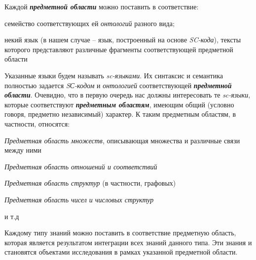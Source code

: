 \begin{SCn}
{Каждой \textbf{\textit{предметной области}} можно поставить в соответствие:
\begin{scnitemize}
    \item семейство соответствующих ей \textit{онтологий} разного вида;
    \item некий язык (в нашем случае -- язык, построенный на основе \textit{SC-кода}), тексты которого представляют различные фрагменты соответствующей предметной области
\end{scnitemize}


Указанные языки будем называть \textit{sc-языками}. Их синтаксис и семантика полностью задается \textit{SС-кодом} и \textit{онтологией} соответствующей \textbf{\textit{предметной области}}. Очевидно, что в первую очередь нас должны интересовать те \textit{sc-языки}, которые соответствуют \textbf{\textit{предметным областям}}, имеющим общий (условно говоря, предметно независимый) характер. К таким предметным областям, в частности, относятся:
\begin{scnitemize}
    \item \textit{Предметная область множеств}, описывающая множества и различные связи между ними
    \item \textit{Предметная область отношений и соответствий}
    \item \textit{Предметная область структур} (в частности, графовых)
    \item \textit{Предметная область чисел и числовых структур}
    \item и т.д
\end{scnitemize}


Каждому типу знаний можно поставить в соответствие предметную область, которая является результатом интеграции всех знаний данного типа. Эти знания и становятся объектами исследования в рамках указанной предметной области.


}
\end{SCn}
